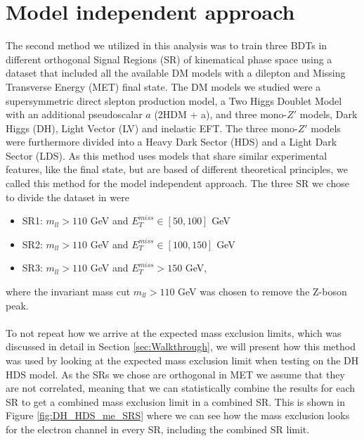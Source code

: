 \documentclass[12pt, a4paper]{book}
\begin{document}
\section{Model independent approach}
The second method we utilized in this analysis was to train three BDTs in different orthogonal Signal Regions (SR) of kinematical phase space using a dataset that included all the available DM models with a dilepton and Missing Transverse Energy (MET) final state. The DM models we studied were a supersymmetric direct slepton production model, a Two Higgs Doublet Model with an additional pseudoscalar $a$ 
(2HDM + a), and three mono-$Z'$ models, Dark Higgs (DH), Light Vector (LV) and inelastic EFT. The three mono-$Z'$ models were furthermore divided into a Heavy Dark Sector (HDS) and a Light Dark Sector (LDS). As this method uses models that share similar experimental features, like the final state, 
but are based of different theoretical principles, we called this method for the model independent approach. The three SR we chose to divide the dataset in were 
\begin{itemize}
   \item SR1: $m_{ll} >110$ GeV and $E_T^{miss} \in [50, 100]$ GeV
   \item SR2: $m_{ll} >110$ GeV and $E_T^{miss} \in [100, 150]$ GeV
   \item SR3: $m_{ll} >110$ GeV and $E_T^{miss} >150$ GeV,
\end{itemize}
where the invariant mass cut $m_{ll}>110$ GeV was chosen to remove the Z-boson peak.\\
\\To not repeat how we arrive at the expected mass exclusion limits, which was discussed in detail in Section \ref{sec:Walkthrough}, we will present how this method was used by looking at the expected mass exclusion limit when testing on the DH HDS model. 
As the SRs we chose are orthogonal in MET we assume that they are not correlated, meaning that we can statistically combine the results for each SR to get a combined mass exclusion limit in a combined SR. This is shown in Figure \ref{fig:DH_HDS_me_SRS} where we can see how the mass exclusion looks for
the electron channel in every SR, including the combined SR limit. \\
\end{document}

